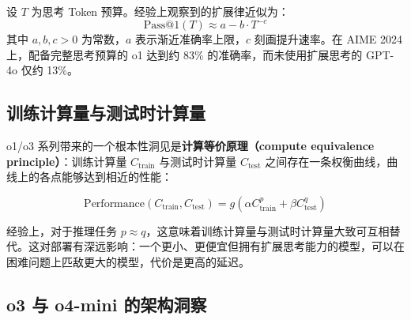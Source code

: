 设 $T$ 为思考 Token 预算。经验上观察到的扩展律近似为：
\begin{equation}
    \text{Pass@1}(T) \approx a - b \cdot T^{-c}
\end{equation}
其中 $a, b, c > 0$ 为常数，$a$ 表示渐近准确率上限，$c$ 刻画提升速率。在 AIME 2024 上，配备完整思考预算的 o1 达到约 83\% 的准确率，而未使用扩展思考的 GPT-4o 仅约 13\%。

\subsection{训练计算量与测试时计算量}
\label{training-compute-vs.-test-time-compute}

o1/o3 系列带来的一个根本性洞见是\textbf{计算等价原理（compute equivalence principle）}：训练计算量 $C_{\text{train}}$ 与测试时计算量 $C_{\text{test}}$ 之间存在一条权衡曲线，曲线上的各点能够达到相近的性能：

\begin{equation}
    \text{Performance}(C_{\text{train}}, C_{\text{test}}) = g\!\left(\alpha C_{\text{train}}^{p} + \beta C_{\text{test}}^{q}\right)
\end{equation}

经验上，对于推理任务 $p \approx q$，这意味着训练计算量与测试时计算量大致可互相替代。这对部署有深远影响：一个更小、更便宜但拥有扩展思考能力的模型，可以在困难问题上匹敌更大的模型，代价是更高的延迟。

\subsection{o3 与 o4-mini 的架构洞察}
\label{o3-and-o4-mini-architecture-insights}

